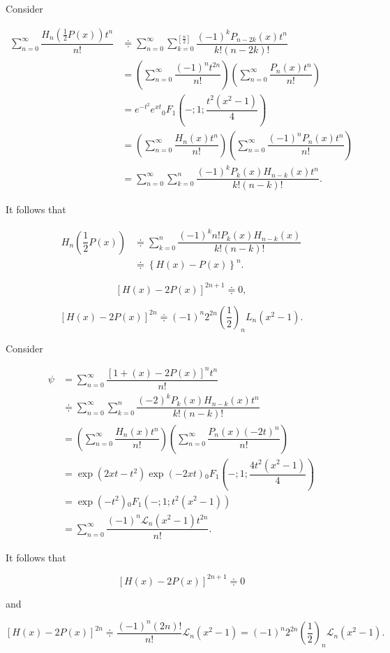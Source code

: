 \begin{solution}
Consider

$$\begin{array}{ll}
\displaystyle\sum_{n=0}^{\infty} \dfrac{H_n\left(\frac{1}{2} P(x) \right) t^n}{n!} &\doteqdot \displaystyle\sum_{n=0}^{\infty} \displaystyle\sum_{k=0}^{[\frac{n}{2}]} \dfrac{(-1)^k P_{n-2k}(x) t^n}{k!(n-2k)!} \\
&= \left( \displaystyle\sum_{n=0}^{\infty} \dfrac{(-1)^n t^{2n}}{n!} \right) \left( \displaystyle\sum_{n=0}^{\infty} \dfrac{P_n(x) t^n}{n!} \right) \\
&= e^{-t^2} e^{xt} {}_0F_1 \left(-;1;\dfrac{t^2(x^2-1)}{4} \right) \\
&= \left( \displaystyle\sum_{n=0}^{\infty} \dfrac{H_n(x)t^n}{n!} \right) \left( \displaystyle\sum_{n=0}^{\infty} \dfrac{(-1)^n P_n(x) t^n}{n!} \right) \\
&= \displaystyle\sum_{n=0}^{\infty} \displaystyle\sum_{k=0}^n \dfrac{(-1)^k P_k(x) H_{n-k}(x) t^n}{k! (n-k)!}.
\end{array}$$

It follows that

$$\begin{array}{ll}
H_n \left( \dfrac{1}{2} P(x) \right) &\doteqdot \displaystyle\sum_{k=0}^n \dfrac{(-1)^k n! P_k(x) H_{n-k}(x)}{k! (n-k)!} \\
&\doteqdot \left\{ H(x) - P(x) \right\}^n.
\end{array}$$
\end{solution}
\begin{problem}\label{problem5chapter15}
$$[H(x)-2P(x)]^{2n+1} \doteqdot 0,$$

$$[H(x)-2P(x)]^{2n} \doteqdot (-1)^n 2^{2n} \left( \dfrac{1}{2} \right)_n L_n(x^2-1).$$
\end{problem}
\begin{solution}
Consider

$$\begin{array}{ll}
\psi &= \displaystyle\sum_{n=0}^{\infty} \dfrac{[1+(x)-2P(x)]^n t^n}{n!} \\
&\doteqdot \displaystyle\sum_{n=0}^{\infty} \displaystyle\sum_{k=0}^n \dfrac{(-2)^k P_k(x) H_{n-k}(x) t^n}{k! (n-k)!} \\
&= \left( \displaystyle\sum_{n=0}^{\infty} \dfrac{H_n(x) t^n}{n!} \right) \left( \displaystyle\sum_{n=0}^{\infty} \dfrac{P_n(x)(-2t)^n}{n!} \right) \\
&= \exp(2xt-t^2) \exp(-2xt) {}_0F_1 \left(-;1;\dfrac{4t^2(x^2-1)}{4} \right) \\
&= \exp(-t^2) {}_0F_1(-;1;t^2(x^2-1)) \\
&= \displaystyle\sum_{n=0}^{\infty} \dfrac{(-1)^n \mathscr{L}_n(x^2-1)t^{2n}}{n!}.
\end{array}$$

It follows that

$$[H(x)-2P(x)]^{2n+1} \doteqdot 0$$

and

$$[H(x)-2P(x)]^{2n} \doteqdot \dfrac{(-1)^n (2n)!}{n!} \mathscr{L}_n(x^2-1) = (-1)^n 2^{2n} \left( \dfrac{1}{2} \right)_n \mathscr{L}_n(x^2-1).$$
\end{solution}
